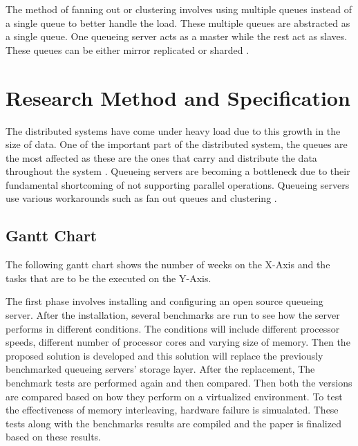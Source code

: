 \documentclass[12pt,a4paper]{article}
\begin{document}
 The method of fanning out or clustering involves using multiple queues instead of a single queue to better handle the load. These multiple queues are abstracted as a single queue. One queueing server acts as a master while the rest act as slaves. These queues can be either mirror replicated or sharded \citep{albrecht2013making}.

\section{Research Method and Specification}

 The distributed systems have come under heavy load due to this growth in the size of data. One of the important part of the distributed system, the queues are the most affected as these are the ones that carry and distribute the data throughout the system \citep{lamport1978time}. Queueing servers are becoming a bottleneck due to their fundamental shortcoming of not supporting parallel operations. Queueing servers use various workarounds such as fan out queues and clustering \citep{albrecht2013making}.
 
 \subsection{Gantt Chart}
 
 The following gantt chart shows the number of weeks on the X-Axis and the tasks that are to be the executed on the Y-Axis.
 
 \begin{gantt}{11}{12}
 \begin{ganttitle}
 \end{ganttitle}
 \end{gantt}

 \bigskip
 The first phase involves installing and configuring an open source queueing server. After the installation, several benchmarks are run to see how the server performs in different conditions. The conditions will include different processor speeds, different number of processor cores and varying size of memory. Then the proposed solution is developed and this solution will replace the previously benchmarked queueing servers' storage layer. After the replacement, The benchmark tests are performed again and then compared. Then both the versions are compared based on how they perform on a virtualized environment. To test the effectiveness of memory interleaving, hardware failure is simualated. These tests along with the benchmarks results are  compiled and the paper is finalized based on these results.
 



\end{document}
